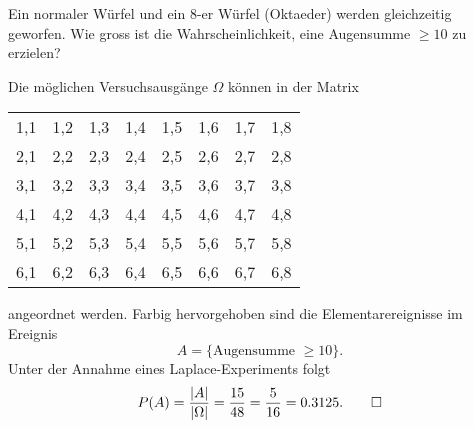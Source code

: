 Ein normaler Würfel und ein 8-er Würfel (Oktaeder) werden gleichzeitig
geworfen. 
Wie gross ist die Wahrscheinlichkeit, eine Augensumme $\ge 10$ zu erzielen?

\begin{loesung}
Die möglichen Versuchsausgänge $\Omega$ können in der Matrix
\begin{center}
\begin{tabular}{|cccccccc|}
\hline
1,1&1,2&1,3&1,4&1,5&1,6&1,7&1,8\\
2,1&2,2&2,3&2,4&2,5&2,6&2,7&\color{red}2,8\\
3,1&3,2&3,3&3,4&3,5&3,6&\color{red}3,7&\color{red}3,8\\
4,1&4,2&4,3&4,4&4,5&\color{red}4,6&\color{red}4,7&\color{red}4,8\\
5,1&5,2&5,3&5,4&\color{red}5,5&\color{red}5,6&\color{red}5,7&\color{red}5,8\\
6,1&6,2&6,3&\color{red}6,4&\color{red}6,5&\color{red}6,6&\color{red}6,7&\color{red}6,8\\
\hline
\end{tabular}
\end{center}
angeordnet werden.
Farbig hervorgehoben sind die Elementarereignisse im Ereignis
\[
A=\{\text{Augensumme $\ge 10$}\}.
\]
Unter der Annahme eines Laplace-Experiments folgt
\[
P(A)=\frac{|A|}{|\Omega|}=\frac{15}{48}=\frac{5}{16}=0.3125.
\qedhere
\]
\end{loesung}

